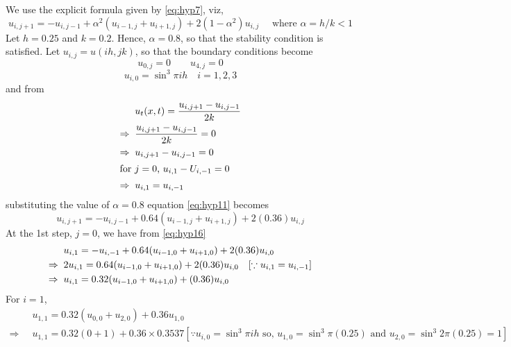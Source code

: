 \documentclass[../main-sheet.tex]{subfiles}
\begin{document}
\begin{soln}
    We use the explicit formula given by \eqref{eq:hyp7}, viz,
    \begin{equation}
        u_{i,j+1}=-u_{i,j-1}+\alpha^2(u_{i-1,j}+u_{i+1,j})+2(1-\alpha^2)u_{i,j}\label{eq:hyp11} \quad\text{ where } \alpha=h/k<1
    \end{equation}
    Let \(h=0.25\) and \(k=0.2\). Hence, \(\alpha=0.8\), so that the stability condition is satisfied. Let \(u_{i,j}=u(ih,jk)\), so that the boundary conditions become
    \begin{equation}
        u_{0,j}=0\qquad u_{4,j}=0 \label{eq:hyp12}
    \end{equation}
    \begin{equation}
        u_{i,0}=\sin^3 \pi i h \quad i=1,2,3 \label{eq:hyp13}
    \end{equation}
    and from
    \begin{align}
        &u_t(x,t)=\frac{u_{i,j+1}-u_{i,j-1}}{2k}\notag\\
        \Rightarrow\;\;&\frac{u_{i,j+1}-u_{i,j-1}}{2k}=0\notag\\
        \Rightarrow\;\;&u_{i,j+1}-u_{i,j-1}=0\notag\\
        \intertext{for \(j=0\), \(u_{i,1}-U_{i,-1}=0\)}
        \Rightarrow\;\;&u_{i,1}=u_{i,-1}\label{eq:hyp14}
    \end{align}
    substituting the value of \(\alpha=0.8\) equation \eqref{eq:hyp11} becomes
    \begin{equation}
        u_{i,j+1}=-u_{i,j-1}+0.64(u_{i-1,j}+u_{i+1,j})+2(0.36)u_{i,j}\label{eq:hyp15}
    \end{equation}
    At the 1st step, \(j=0\), we have from \eqref{eq:hyp16}
    \begin{align}
        &u_{i,1}=-u_{i,-1}+0.64(u_{i-1,0}+u_{i+1,0})+2(0.36)u_{i,0}\label{eq:hyp16}\\
        \Rightarrow\;\;&2u_{i,1}=0.64(u_{i-1,0}+u_{i+1,0})+2(0.36)u_{i,0}\notag\quad[\because u_{i,1}=u_{i,-1}]\\
        \Rightarrow\;\;&u_{i,1}=0.32(u_{i-1,0}+u_{i+1,0})+(0.36)u_{i,0}\label{eq:hyp17}
    \end{align}
    For \(i=1\),
    \begin{align*}
        &u_{1,1}=0.32(u_{0,0}+u_{2,0})+0.36u_{1,0}\\
        \Rightarrow\;\;&u_{1,1}=0.32(0+1)+0.36\times 0.3537 [\because u_{i,0}=\sin^3\pi i h \text{ so, } u_{1,0}=\sin^3\pi (0.25)\text{ and }u_{2,0}=\sin^3 2\pi (0.25)=1]\\

\end{align*}
\end{soln}
\end{document}

